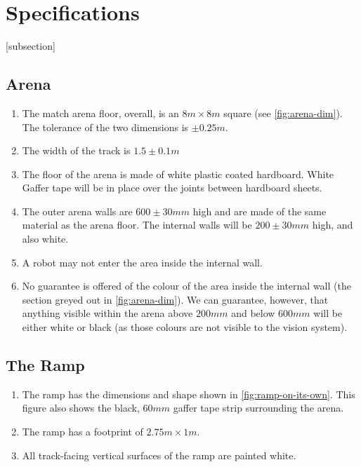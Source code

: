 \section{Specifications}
\label{sec:Specifications}

[subsection]
\newcommand{\rcnii}{\stepcounter{rulei}\arabic{section}.\arabic{subsection}.\arabic{rulei}}
\renewcommand{\labelenumi}{\rcnii}

\subsection{Arena}
\label{sub:arena}
\begin{enumerate}
\item The match arena floor, overall, is an $8m \times 8m$ square (see \autoref{fig:arena-dim}).
 The tolerance of the two dimensions is $\pm0.25m$.
\item The width of the track is $1.5\pm0.1m$
\item The floor of the arena is made of white plastic coated hardboard.
 White Gaffer tape will be in place over the joints between hardboard sheets.
\item The outer arena walls are $600\pm30mm$ high and are made of the same material as the arena floor.
 The internal walls will be $200\pm30mm$ high, and also white.
\item A robot may not enter the area inside the internal wall.
\item No guarantee is offered of the colour of the area inside the internal wall (the section greyed out in \autoref{fig:arena-dim}).
 We can guarantee, however, that anything visible within the arena above $200mm$ and below $600mm$ will be either white or black (as those colours are not visible to the vision system).
\end{enumerate}

\subsection{The Ramp}
\label{sub:Ramp}
\begin {enumerate}
\item The ramp has the dimensions and shape shown in \autoref{fig:ramp-on-its-own}.
 This figure also shows the black, $60mm$ gaffer tape strip surrounding the arena.
\item The ramp has a footprint of $2.75m \times 1m$.
\item All track-facing vertical surfaces of the ramp are painted white.
\end {enumerate}


